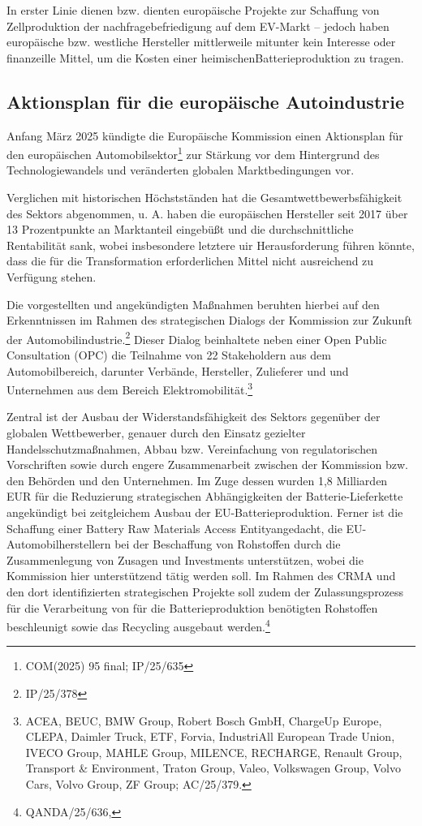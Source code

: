 \documentclass[12pt,a4paper,oneside]{book} %
\begin{document}
{{In erster Linie dienen bzw. dienten europäische Projekte zur Schaffung von Zellproduktion der nachfragebefriedigung auf dem EV-Markt -- jedoch haben europäische bzw. westliche Hersteller mittlerweile mitunter kein Interesse oder finanzeille Mittel, um die Kosten einer \glqq heimischen\grqq Batterieproduktion zu tragen.\autocite{McBridge, S. 30}
	
	\subsection{Aktionsplan für die europäische Autoindustrie}
	Anfang März 2025 kündigte die Europäische Kommission einen Aktionsplan für den europäischen Automobilsektor\footnote{COM(2025) 95 final; IP/25/635} zur Stärkung vor dem Hintergrund des Technologiewandels und veränderten globalen Marktbedingungen vor.
	
	Verglichen mit historischen Höchstständen hat die Gesamtwettbewerbsfähigkeit des Sektors abgenommen, u. A. haben die europäischen Hersteller seit 2017 über 13 Prozentpunkte an Marktanteil eingebüßt und die durchschnittliche Rentabilität sank, wobei insbesondere letztere uir Herausforderung führen könnte, dass die für die Transformation erforderlichen Mittel nicht ausreichend zu Verfügung stehen.\autocite{McKinsey: European automotive industry: What it takes to regain competitiveness, S. 2}
	
	Die vorgestellten und angekündigten Maßnahmen beruhten hierbei auf den Erkenntnissen im Rahmen des strategischen Dialogs der Kommission zur Zukunft der Automobilindustrie.\footnote{IP/25/378} Dieser Dialog beinhaltete neben einer Open Public Consultation (OPC) die Teilnahme von 22 Stakeholdern aus dem Automobilbereich, darunter Verbände, Hersteller, Zulieferer und und Unternehmen aus dem Bereich Elektromobilität.\footnote{ACEA, BEUC, BMW Group, Robert Bosch GmbH, ChargeUp Europe, CLEPA, Daimler Truck, ETF, Forvia, IndustriAll European Trade Union, IVECO Group, MAHLE Group, MILENCE, RECHARGE, Renault Group, Transport \& Environment, Traton Group, Valeo, Volkswagen Group, Volvo Cars, Volvo Group, ZF Group; AC/25/379.}
	
	
	Zentral ist der Ausbau der Widerstandsfähigkeit des Sektors gegenüber der globalen Wettbewerber, genauer durch den Einsatz gezielter Handelsschutzmaßnahmen, Abbau bzw. Vereinfachung von regulatorischen Vorschriften sowie durch engere Zusammenarbeit zwischen der Kommission bzw. den Behörden und den Unternehmen. Im Zuge dessen wurden 1,8 Milliarden EUR für die Reduzierung strategischen Abhängigkeiten der Batterie-Lieferkette angekündigt bei zeitgleichem Ausbau der EU-Batterieproduktion. Ferner ist die Schaffung einer \glqq Battery Raw Materials Access Entity\grqq angedacht, die EU-Automobilherstellern bei der Beschaffung von Rohstoffen durch die Zusammenlegung von Zusagen und Investments unterstützen, wobei die Kommission hier unterstützend tätig werden soll. Im Rahmen des CRMA und den dort identifizierten strategischen Projekte soll zudem der Zulassungsprozess für die Verarbeitung von für die Batterieproduktion benötigten Rohstoffen beschleunigt sowie das Recycling ausgebaut werden.\footnote{QANDA/25/636, }
	
}}
\end{document}
